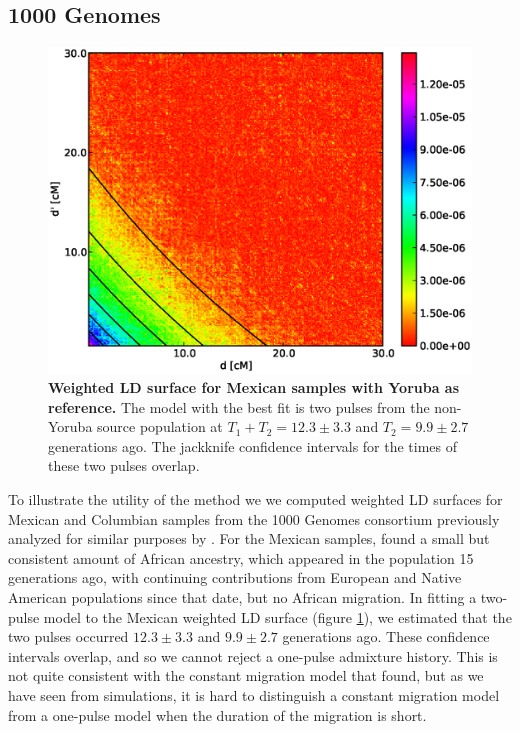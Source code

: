 \subsection{1000 Genomes}
\begin{figure}
\includegraphics[scale=.6]{MXL.eps}
\caption{
{\bf Weighted LD surface for Mexican samples with Yoruba as reference.} The model with the best fit is two pulses from the non-Yoruba source population at $T_1+T_2=12.3 \pm 3.3$ and $T_2=9.9\pm 2.7$ generations ago. The jackknife confidence intervals for the times of these two pulses overlap.
}
\label{ASH_MXL}
\end{figure}

To illustrate the utility of the method we we computed weighted LD surfaces for Mexican and Columbian samples from the 1000 Genomes consortium previously analyzed for similar purposes by \cite{gravel2013reconstructing}. For the Mexican samples, \cite{gravel2013reconstructing} found a small but consistent amount of African ancestry, which appeared in the population 15 generations ago, with continuing contributions from European and Native American populations since that date, but no African migration. In fitting a two-pulse model to the Mexican weighted LD surface (figure \ref{ASH_MXL}), we estimated that the two pulses occurred $12.3\pm3.3$ and $9.9\pm2.7$ generations ago. These confidence intervals overlap, and so we cannot reject a one-pulse admixture history. This is not quite consistent with the constant migration model that \cite{gravel2013reconstructing} found, but as we have seen from simulations, it is hard to distinguish a constant migration model from a one-pulse model when the duration of the migration is short.

